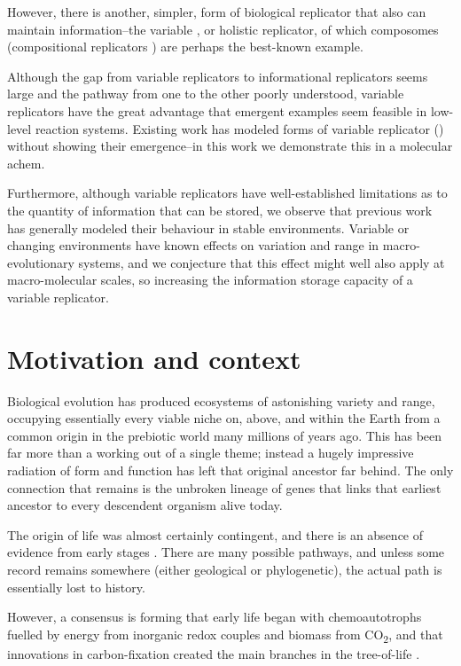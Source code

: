 However, there is another, simpler, form of biological replicator that also can maintain information--the variable \parencite{Zachar2010}, or holistic replicator, of which composomes (compositional replicators \parencite{Segre1998}) are perhaps the best-known example. 

Although the gap from variable replicators to informational replicators seems large and the pathway from one to the other poorly understood, variable replicators have the great advantage that emergent examples seem feasible in low-level reaction systems. Existing work has modeled forms of variable replicator (\eg \cite{Vasas2012}) without showing their emergence--in this work we demonstrate this in a molecular \gls{achem}.

Furthermore, although variable replicators have well-established limitations as to the quantity of information that can be stored, we observe that previous work has generally modeled their behaviour in stable environments. Variable or changing environments have known effects on variation and range in macro-evolutionary systems, and we conjecture that this effect might well also apply at macro-molecular scales, so increasing the information storage capacity of a variable replicator.

\section{Motivation and context}

Biological evolution has produced ecosystems of astonishing variety and range, occupying essentially every viable niche on, above, and within the Earth from a common origin in the prebiotic world many millions of years ago. This has been far more than a working out of a single theme; instead a hugely impressive radiation of form and function has left that original ancestor far behind. The only connection that remains is the unbroken lineage of genes that links that earliest ancestor to every descendent organism alive today.

The origin of life was almost certainly contingent, and there is an absence of evidence from early stages \parencite{Pross2013}. There are many possible pathways, and unless some record remains somewhere (either geological or phylogenetic), the actual path is essentially lost to history.

However, a consensus is forming that early life began with chemoautotrophs fuelled by energy from inorganic redox couples and biomass from CO\textsubscript{2}, and that innovations in carbon-fixation created the main branches in the tree-of-life \parencite{Braakman2012}. 

